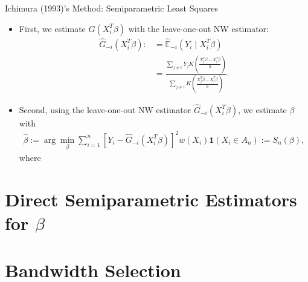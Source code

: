 \documentclass[xcolor=svgnames,dvipdfmx,cjk]{beamer}
\theoremstyle{example}
\begin{document}
\begin{frame}{Ichimura (1993)'s Method: Semiparametric Least Squares}
  \begin{itemize}
  \item First, we estimate $G(X_i^{T}\beta)$  
        with the leave-one-out NW estimator:
        \begin{align*}
          \hat{G}_{-i}(X_i^{T}\beta) 
              :&= \hat{\mathbb{E}}_{-i}(Y_i \mid X_i^{T} \beta) \\
               &= \frac
                  {\sum_{j \neq i} Y_j 
                   K \left( \frac
                            {X_j^{T}\beta - X_i^{T}\beta}
                            {h} 
                     \right) 
                  }
                  {\sum_{j \neq i} 
                   K \left( \frac
                           {X_j^{T}\beta - X_i^{T}\beta}
                           {h} 
                     \right) 
                  }.
        \end{align*}
  \item Second, 
        using the leave-one-out NW estimator $\hat{G}_{-i}(X_i^{T}\beta)$,
        we estimate $\beta$ with
        \begin{align*}
          \hat{\beta} 
            := \arg \min_{\beta} 
                   \sum_{i=1}^{n}  
                        \left[ Y_i - \hat{G}_{-i}(X_i^{T}\beta) \right]^2 
                        w(X_i) \mathbf{1}(X_i \in A_n) := S_n(\beta),
        \end{align*}
        where 
\end{itemize}
\end{frame}



\section{Direct Semiparametric Estimators for $\beta$}
\begin{frame}
  \tableofcontents[currentsection]
\end{frame}









\section{Bandwidth Selection}
\begin{frame}
  \tableofcontents[currentsection]
\end{frame}
\end{document}
